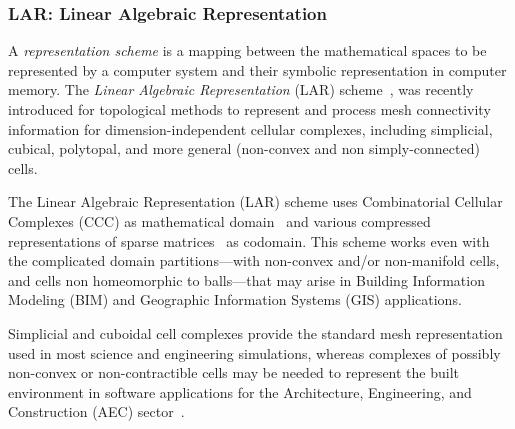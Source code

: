 \documentclass[]{egpubl}
\begin{document}
\subsubsection*{LAR: Linear Algebraic Representation} 

A \emph{representation scheme} is a mapping between the mathematical spaces to be represented by a computer system and their symbolic representation in computer memory. 
The \emph{Linear Algebraic Representation} (LAR) scheme~\cite{Dicarlo:2014:TNL:2543138.2543294}, was recently introduced for topological methods to represent and process mesh connectivity information for dimension-independent cellular complexes, including simplicial, cubical, polytopal, and more general (non-convex and non simply-connected) cells. 

The Linear Algebraic Representation (LAR) scheme uses Combinatorial Cellular Complexes (CCC) as mathematical domain~\cite{Basak:2010} and various compressed representations of sparse matrices~\cite{Williams:2007:OSM:1362622.1362674,gemmexp} as codomain.
This scheme works even with the complicated domain partitions---with non-convex and/or non-manifold cells, and cells non homeomorphic to balls---that may arise in Building Information Modeling (BIM) and Geographic Information Systems (GIS) applications. 

Simplicial and cuboidal cell complexes provide the standard mesh representation used in most science and engineering simulations, whereas complexes of possibly non-convex or non-contractible cells may be needed to represent the built environment in software applications for the Architecture, Engineering, and Construction (AEC) sector~\cite{paoluzziMS:2014}.
\end{document}
